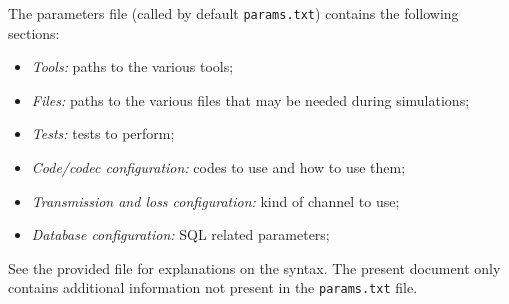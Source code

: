 \documentclass[a4paper,11pt]{article}
\begin{document}
{The parameters file (called by default \verb+params.txt+) contains the following sections:
\begin{itemize}
\item \emph{Tools:} paths to the various tools;
\item \emph{Files:} paths to the various files that may be needed during simulations;
\item \emph{Tests:} tests to perform;
\item \emph{Code/codec configuration:} codes to use and how to use them;
\item \emph{Transmission and loss configuration:} kind of channel to use;
\item \emph{Database configuration:} SQL related parameters; 
\end{itemize}

\noindent See the provided file for explanations on the syntax. The present document only
contains additional information not present in the \verb+params.txt+ file.


}
\end{document}
